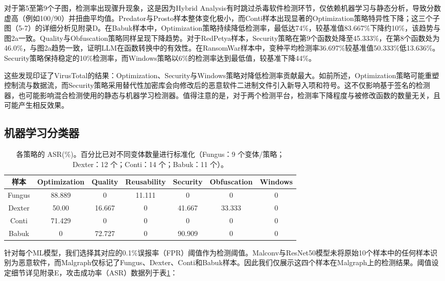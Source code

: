对于第5至第9个子图，检测率出现骤升现象，这是因为Hybrid Analysis有时跳过杀毒软件检测环节，仅依赖机器学习与静态分析，导致分数虚高（例如100/90）并扭曲平均值。Predator与Prosto样本整体变化极小，而Conti样本出现显著的Optimization策略特异性下降；这三个子图（5-7）的详细分析见附录D。在Babuk样本中，Optimization策略持续降低检测率，最低达74\%，较基准值83.667\%下降约10\%，该趋势与图2a一致。Quality与Obfuscation策略同样呈现下降趋势。对于RedPetya样本，Security策略在第9个函数处降至45.333\%，在第8个函数处为46.0\%，与图2a趋势一致，证明LLM在函数转换中的有效性。在RansomWar样本中，变种平均检测率36.697\%较基准值50.333\%低13.636\%。Security策略保持稳定的10\%检测率，而Windows策略以6\%的检测率达到最低值，较基准下降44\%。

这些发现印证了VirusTotal的结果：Optimization、Security与Windows策略对降低检测率贡献最大。如前所述，Optimization策略可能重塑控制流与数据流，而Security策略采用替代性加密库会向修改后的恶意软件二进制文件引入新导入项和符号。这不仅影响基于签名的检测器，也可能影响混合检测使用的静态与机器学习检测器。值得注意的是，对于两个检测平台，检测率下降程度与被修改函数的数量无关，且可能产生相反效果。

\subsection{机器学习分类器}
\begin{table}[htbp]
	\centering
	\caption{各策略的 ASR(\%)。百分比已对不同变体数量进行标准化（Fungus：9 个变体/策略；Dexter：12 个；Conti：14 个；Babuk：11 个）。}
	\label{tab:5.1}
	\begin{tabular*}{\textwidth}{@{\extracolsep{\fill}}ccccccc}
		\toprule
		样本 & Optimization & Quality & Reusability & Security & Obfuscation & Windows \\
		\midrule
		Fungus & 88.889 & 0 & 11.111 & 0 & 0 & 0 \\
		Dexter & 50.00 & 16.667 & 0 & 41.667 & 33.333 & 0 \\
		Conti & 71.429 & 0 & 0 & 0 & 0 & 0 \\
		Babuk & 0 & 72.727 & 0 & 90.909 & 0 & 0 \\
		\bottomrule
	\end{tabular*}
\end{table}

针对每个ML模型，我们选择其对应的0.1\%误报率（FPR）阈值作为检测阈值。Malconv与ResNet50模型未将原始10个样本中的任何样本识别为恶意软件，而Malgraph仅标记了Fungus、Dexter、Conti和Babuk样本。因此我们仅展示这四个样本在Malgraph上的检测结果。阈值设定细节详见附录E，攻击成功率（ASR）数据列于表\ref{tab:5.1}：

